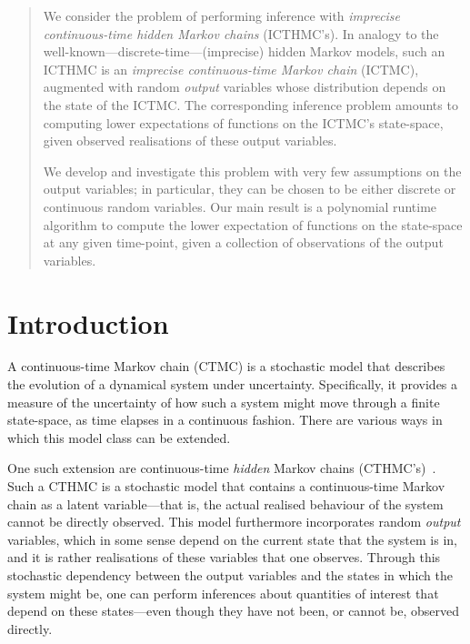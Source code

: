 \documentclass[twoside,11pt]{article}
\begin{document}
\begin{abstract}
We consider the problem of performing inference with \emph{imprecise continuous-time hidden Markov chains} (ICTHMC's). In analogy to the well-known---discrete-time---(imprecise) hidden Markov models, such an ICTHMC is an \emph{imprecise continuous-time Markov chain} (ICTMC), augmented with random \emph{output} variables whose distribution depends on the state of the ICTMC. The corresponding inference problem amounts to computing lower expectations of functions on the ICTMC's state-space, given observed realisations of these output variables.

We develop and investigate this problem with very few assumptions on the output variables; in particular, they can be chosen to be either discrete or continuous random variables. Our main result is a polynomial runtime algorithm to compute the lower expectation of functions on the state-space at any given time-point, given a collection of observations of the output variables.
\end{abstract}

\section{Introduction}\label{sec:introduction}

A continuous-time Markov chain (CTMC) is a stochastic model that describes the evolution of a dynamical system under uncertainty. Specifically, it provides a measure of the uncertainty of how such a system might move through a finite state-space, as time elapses in a continuous fashion. There are various ways in which this model class can be extended.

One such extension are continuous-time \emph{hidden} Markov chains (CTHMC's)~\citep{wei2002continuous}. Such a CTHMC is a stochastic model that contains a continuous-time Markov chain as a latent variable---that is, the actual realised behaviour of the system cannot be directly observed. This model furthermore incorporates random \emph{output} variables, which in some sense depend on the current state that the system is in, and it is rather realisations of these variables that one observes. Through this stochastic dependency between the output variables and the states in which the system might be, one can perform inferences about quantities of interest that depend on these states---even though they have not been, or cannot be, observed directly.

\end{document}
